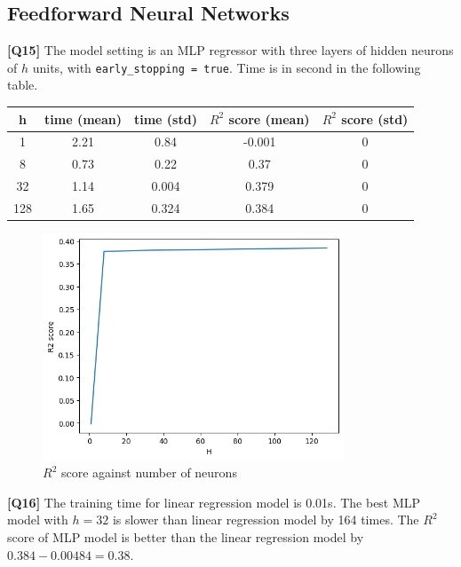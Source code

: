 \documentclass{article}
\begin{document}
\begin{description}
		\subsection*{Feedforward Neural Networks}
	\item \textbf{[Q15]}
		The model setting is an MLP regressor with three layers of hidden neurons of $h$ units, with \texttt{early\_stopping = true}. Time is in second in the following table.
		\begin{center}
			\begin{tabular}{|c|c|c|c|c|}
				\hline
				h & time (mean) & time (std) & $R^2$ score (mean) & $R^2$ score (std) \\
				\hline
				1 & 2.21 & 0.84 & -0.001 & 0 \\
				8 & 0.73 & 0.22 & 0.37 & 0 \\
				32 & 1.14 & 0.004 & 0.379 & 0 \\
				128 & 1.65 & 0.324 & 0.384 & 0 \\
				\hline
			\end{tabular}
		\end{center}
		\begin{figure}[H]
			\centering
			\includegraphics[width=0.8\textwidth]{figures/q15_r2_score.png}
			\caption{$R^2$ score against number of neurons}
			\label{q15}
		\end{figure}
	\item  \textbf{[Q16]} The training time for linear regression model is 0.01s. The best MLP model with $h=32$ is slower than linear regression model by 164 times. The $R^2$ score of MLP model is better than the linear regression model by $0.384-0.00484 = 0.38$.


\end{description}
\end{document}
